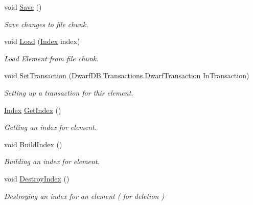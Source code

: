 \begin{DoxyCompactItemize}
\item 
void \hyperlink{class_dwarf_d_b_1_1_data_structures_1_1_record_a01889e57146fd3882228b09d2d54d51c}{Save} ()
\begin{DoxyCompactList}\small\item\em Save changes to file chunk. \item\end{DoxyCompactList}\item 
void \hyperlink{class_dwarf_d_b_1_1_data_structures_1_1_record_aba01a54cf8111326625980fd9b1d4d92}{Load} (\hyperlink{class_dwarf_d_b_1_1_data_structures_1_1_index}{Index} index)
\begin{DoxyCompactList}\small\item\em Load Element from file chunk. \item\end{DoxyCompactList}\item 
void \hyperlink{class_dwarf_d_b_1_1_data_structures_1_1_record_a4997c638afaaa5b8f281a492b639dfca}{SetTransaction} (\hyperlink{class_dwarf_d_b_1_1_transactions_1_1_dwarf_transaction}{DwarfDB.Transactions.DwarfTransaction} InTransaction)
\begin{DoxyCompactList}\small\item\em Setting up a transaction for this element. \item\end{DoxyCompactList}\item 
\hyperlink{class_dwarf_d_b_1_1_data_structures_1_1_index}{Index} \hyperlink{class_dwarf_d_b_1_1_data_structures_1_1_record_abf7b1ed28e2f443a17f7658222b59c8f}{GetIndex} ()
\begin{DoxyCompactList}\small\item\em Getting an index for element. \item\end{DoxyCompactList}\item 
void \hyperlink{class_dwarf_d_b_1_1_data_structures_1_1_record_ab4ae005ad5474eb98a8aa45d7f8dd195}{BuildIndex} ()
\begin{DoxyCompactList}\small\item\em Building an index for element. \item\end{DoxyCompactList}\item 
void \hyperlink{class_dwarf_d_b_1_1_data_structures_1_1_record_a6548196371053293f6333d4c29fd5f0d}{DestroyIndex} ()
\begin{DoxyCompactList}\small\item\em Destroying an index for an element ( for deletion ) \item\end{DoxyCompactList}\item 

\end{DoxyCompactItemize}
